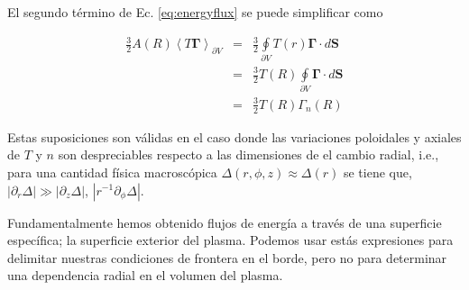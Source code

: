El segundo t\'ermino de Ec. \eqref{eq:energyflux} se puede simplificar como

\begin{eqnarray}
  \frac{3}{2}A(R)\left<T\pmb{\Gamma}\right>_{\partial V} &=& \frac{3}{2}\oint\limits_{\partial V} T(r)\pmb{\Gamma}\cdot d\textbf{S} \\
                                                         &=& \frac{3}{2}T(R)\oint\limits_{\partial V} \pmb{\Gamma}\cdot d\textbf{S}\\
                                                      &=& \frac{3}{2}T(R)\Gamma_n(R)
\end{eqnarray}

Estas suposiciones son v\'alidas en el caso donde las variaciones poloidales y axiales de $T$ y $n$ son despreciables respecto a las dimensiones de el cambio radial, i.e., para una cantidad f\'isica macrosc\'opica $\Delta(r,\phi, z) \approx \Delta(r)$ se tiene que, $|\partial_r \Delta| \gg |\partial_z\Delta|$, $|r^{-1}\partial_\phi\Delta|$.

Fundamentalmente hemos obtenido flujos de energ\'ia a trav\'es de una superficie espec\'ifica; la superficie exterior del plasma. Podemos usar est\'as expresiones para delimitar nuestras condiciones de frontera en el borde, pero no para determinar una dependencia radial en el volumen del plasma. 
